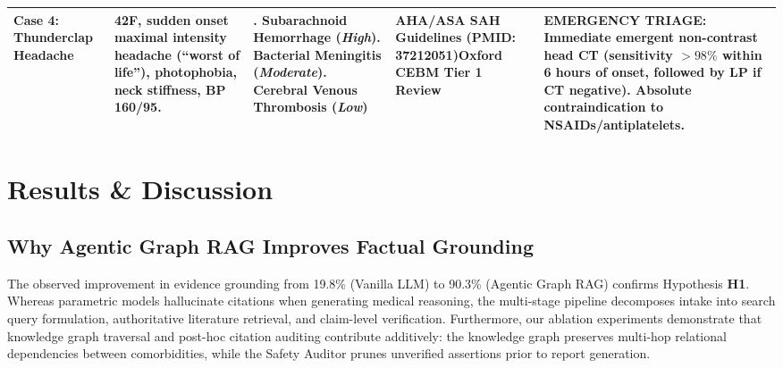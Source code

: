\documentclass[journal,10pt,twocolumn]{IEEEtran}
\begin{document}
\begin{table}[!t]
\begin{tabularx}{\textwidth}{>{\raggedright\arraybackslash}p{2.2cm}>{\raggedright\arraybackslash}p{3.2cm}>{\raggedright\arraybackslash}p{3.1cm}>{\raggedright\arraybackslash}p{3.0cm}>{\raggedright\arraybackslash}X}
\midrule
\textbf{Case 4: Thunderclap Headache} & 42F, sudden onset maximal intensity headache (``worst of life''), photophobia, neck stiffness, BP 160/95. & 1. Subarachnoid Hemorrhage (\textit{High})\newline 2. Bacterial Meningitis (\textit{Moderate})\newline 3. Cerebral Venous Thrombosis (\textit{Low}) & AHA/ASA SAH Guidelines (PMID: 37212051)\newline Oxford CEBM Tier 1 Review & \textbf{EMERGENCY TRIAGE:} Immediate emergent non-contrast head CT (sensitivity $>98\%$ within 6 hours of onset, followed by LP if CT negative). Absolute contraindication to NSAIDs/antiplatelets. \\
\bottomrule
\end{tabularx}
\end{table}

\section{Results \& Discussion}

\subsection{Why Agentic Graph RAG Improves Factual Grounding}
The observed improvement in evidence grounding from 19.8\% (Vanilla LLM) to 90.3\% (Agentic Graph RAG) confirms Hypothesis \textbf{H1}. Whereas parametric models hallucinate citations when generating medical reasoning, the multi-stage pipeline decomposes intake into search query formulation, authoritative literature retrieval, and claim-level verification. Furthermore, our ablation experiments demonstrate that knowledge graph traversal and post-hoc citation auditing contribute additively: the knowledge graph preserves multi-hop relational dependencies between comorbidities, while the Safety Auditor prunes unverified assertions prior to report generation.
\end{document}
